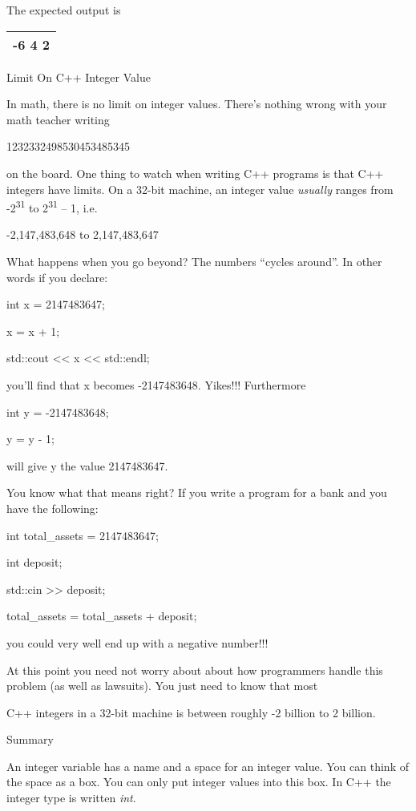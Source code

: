 \documentclass[
]{article}
\begin{document}
The expected output is

\begin{longtable}[]{@{}l@{}}
\toprule
\endhead
-6 4 2\tabularnewline
\bottomrule
\end{longtable}

Limit On C++ Integer Value

In math, there is no limit on integer values. There's nothing wrong with
your math teacher writing

1232332498530453485345

on the board. One thing to watch when writing C++ programs is that C++
integers have limits. On a 32-bit machine, an integer value
\emph{usually} ranges from -2\textsuperscript{31} to
2\textsuperscript{31 } -- 1, i.e.

-2,147,483,648 to 2,147,483,647

What happens when you go beyond? The numbers ``cycles around''. In other
words if you declare:

int x = 2147483647;

x = x + 1;

std::cout \textless\textless{} x \textless\textless{} std::endl;

you'll find that x becomes -2147483648. Yikes!!! Furthermore

int y = -2147483648;

y = y - 1;

will give y the value 2147483647.

You know what that means right? If you write a program for a bank and
you have the following:

int total\_assets = 2147483647;

int deposit;

std::cin \textgreater\textgreater{} deposit;

total\_assets = total\_assets + deposit;

you could very well end up with a negative number!!!

At this point you need not worry about about how programmers handle this
problem (as well as lawsuits). You just need to know that most

C++ integers in a 32-bit machine is between roughly -2 billion to 2
billion.

Summary

An integer variable has a name and a space for an integer value. You can
think of the space as a box. You can only put integer values into this
box. In C++ the integer type is written \emph{int}.
\end{document}
